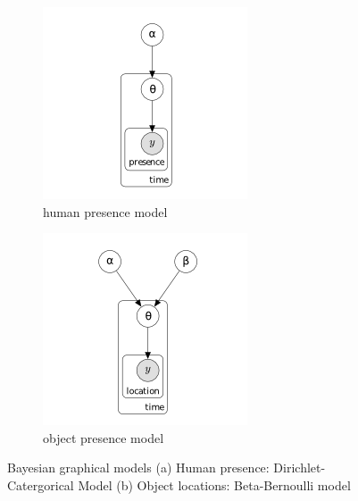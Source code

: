 \documentclass[a4paper, 10pt, conference]{ieeeconf}      %
\begin{document}
\begin{figure}[!tbp]
  \center
  \begin{subfigure}[b]{0.2\textwidth}
    \includegraphics[width=\textwidth]{dirichlet-categorical.png}
    \caption{human presence model}
    \label{fig:f1}
  \end{subfigure}
    \hspace{3em}
  \begin{subfigure}[b]{0.2\textwidth}
    \includegraphics[width=\textwidth]{beta-bernoulli.png}
    \caption{object presence model}
    \label{fig:f2}
  \end{subfigure}
  \caption{Bayesian graphical models  (a) Human presence: Dirichlet-Catergorical Model (b) Object locations: Beta-Bernoulli model}
\end{figure}
\end{document}
